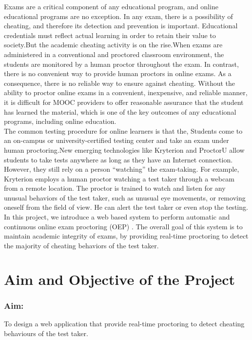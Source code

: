 \documentclass[12pt]{report}
\begin{document}
Exams are a critical component of any educational program, and online educational programs are no exception. In any exam, there is a possibility of cheating, and therefore its detection and prevention is important. Educational credentials must reflect actual learning in order to retain their value to society.But the academic cheating activity is on the rise.When exams are administered in a conventional and proctored classroom environment, the students are monitored by a human proctor throughout the exam. In contrast, there is no convenient way to provide human proctors in online exams. As a consequence, there is no reliable way to ensure against cheating. Without the ability to proctor online exams in a convenient, inexpensive, and reliable manner, it is difficult for MOOC providers to offer reasonable assurance that the student has learned the material, which is one of the key outcomes of any educational programs, including online education.\\

The common testing procedure for online learners is that the,
Students come to an on-campus or university-certified testing center and take an exam under human proctoring.New emerging technologies like Kryterion and ProctorU allow students to take tests anywhere as  long as they have an Internet connection. However, they still rely on a person “watching” the exam-taking. For example, Kryterion employs a human proctor watching a test taker through a webcam from a remote location. The proctor is trained to watch and listen for any unusual behaviors of the test taker, such as unusual eye movements, or removing oneself from the field of view. He can alert the test taker or even stop the testing.\\

In this project, we introduce a web based system to perform automatic and continuous online exam proctoring (OEP) . The overall goal of this system is to maintain academic integrity of exams, by providing real-time proctoring to detect the majority of cheating behaviors of the test taker.

\section{Aim and Objective of the Project}
\subsubsection{Aim:}
To design a web application that provide real-time proctoring to detect cheating behaviours of the test taker.
\end{document}

